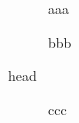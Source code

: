 \documentclass[11pt]{article}
\begin{document}
\begin{description}
    \item[\null] aaa
    \item[] bbb
    \item[head] ccc
\end{description}
\end{document}
